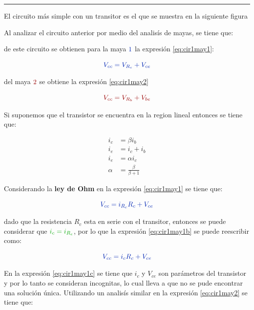 \documentclass{article}
\begin{document}
\begin{center}\rule{3in}{0.4pt}\end{center}

El circuito más simple con un transitor es el que se muestra en la
siguiente figura

Al analizar el circuito anterior por medio del analisís de mayas, se
tiene que:

de este circuito se obtienen para la maya $\color{blue}{1}$ la expresión
\eqref{eq:cir1may1}:

\begin{equation}\label{eq:cir1may1}
\color{blue}{V_{cc}=V_{R_{c}}+V_{ce}}
\end{equation}

del maya $\color{red}{2}$ se obtiene la expresión \eqref{eq:cir1may2}

\begin{equation}\label{eq:cir1may2}
\color{red}{V_{cc}=V_{R_{b}}+V_{be}}
\end{equation}

Si suponemos que el transistor se encuentra en la region lineal entonces
se tiene que:


\begin{align}
\label{eq:ic} i_{c} &= \beta i_{b}  \\
\label{eq:Ie} i_{e} & = i_{c} + i_{b} \\
\label{eq:icIe} i_{e} & = \alpha i_{c}   \\ 
\label{eq:alhpa} \alpha & = \frac{\beta}{\beta+1} 
\end{align}


Considerando la \textbf{ley de Ohm} en la expresión \eqref{eq:cir1may1}
se tiene que:

\begin{equation}\label{eq:cir1may1b}
\color{blue}{V_{cc}=i_{R_{c}}R_{c}+V_{ce}}
\end{equation}

dado que la resistencia $R_{c}$ esta en serie con el transitor, entonces
se puede considerar que $\color{green}{i_{c}=i_{R_{c}}}$, por lo que la
expresión \eqref{eq:cir1may1b} se puede reescribir como:

\begin{equation}\label{eq:cir1may1c}
\color{blue}{V_{cc}=i_{c}R_{c}+V_{ce}}
\end{equation}

En la expresión \eqref{eq:cir1may1c} se tiene que $i_{c}$ y $V_{ce}$ son
parámetros del transistor y por lo tanto se consideran incognitas, lo
cual lleva a que no se pude encontrar una solución única. Utilizando un
analisís similar en la expresión \eqref{eq:cir1may2} se tiene que:
\end{document}

